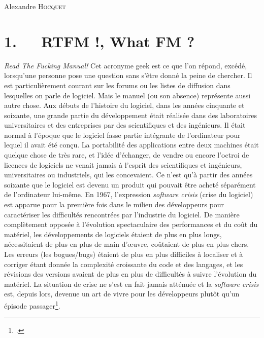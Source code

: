 \documentclass{FramateX}
\begin{document}
\begin{refsection}

\begin{flushright}
Alexandre \textsc{Hocquet}
\end{flushright}
\vspace{10 mm}

\section*{1.~~~RTFM !, What FM ?}
{}


\textit{Read The Fucking Manual!} Cet acronyme geek est ce que
l'on répond, excédé, lorsqu'une personne
pose une question sans s'être donné la peine de
chercher. Il est particulièrement courant sur les forums ou les listes
de diffusion dans lesquelles on parle de logiciel. Mais le manuel (ou
son absence) représente aussi autre chose. Aux débuts de
l'histoire du logiciel, dans les années cinquante et
soixante, une grande partie du développement était réalisée dans des
laboratoires universitaires et des entreprises par des scientifiques et
des ingénieurs. Il était normal à l'époque que le
logiciel fasse partie intégrante de l'ordinateur pour
lequel il avait été conçu. La portabilité des applications entre deux
machines était quelque chose de très rare, et l'idée
d'échanger, de vendre ou encore
l'octroi de licences de logiciels ne venait jamais à
l'esprit des scientifiques et ingénieurs,
universitaires ou industriels, qui les concevaient. Ce
n'est qu'à partir des années soixante
que le logiciel est devenu un produit qui pouvait être acheté
séparément de l'ordinateur lui-même. En 1967,
l'expression \textit{software crisis} (crise du
logiciel) est apparue pour la première fois dans le milieu des
développeurs pour caractériser les difficultés rencontrées par
l'industrie du logiciel. De manière complètement
opposée à l'évolution spectaculaire des performances
et du coût du matériel, les développements de logiciels étaient de plus
en plus longs, nécessitaient de plus en plus de main d'œuvre, coûtaient
de plus en plus chers. Les erreurs (les bogues/bugs) étaient de plus en
plus difficiles à localiser et à corriger étant donnée la complexité
croissante du code et des langages, et les révisions des versions
avaient de plus en plus de difficultés à suivre
l'évolution du matériel. La situation de crise ne
s'est en fait jamais atténuée et la \textit{software
crisis} est, depuis lors, devenue un art de vivre pour les
développeurs plutôt qu'un épisode passager\footnote{\cite{Ensmenger2010}.}.


\end{refsection}
\end{document}
